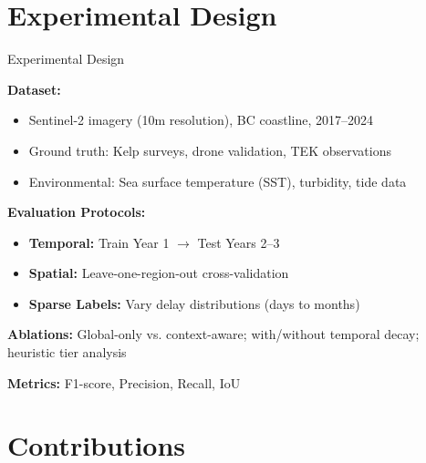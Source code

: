 \documentclass[10pt,xcolor={table,dvipsnames}]{beamer}
\begin{document}
\section{Experimental Design}

\begin{frame}{Experimental Design}

\textbf{Dataset:}
\begin{itemize}
  \item Sentinel-2 imagery (10m resolution), BC coastline, 2017--2024
  \item Ground truth: Kelp surveys, drone validation, TEK observations
  \item Environmental: Sea surface temperature (SST), turbidity, tide data
\end{itemize}

\vspace{0.3em}
\textbf{Evaluation Protocols:}
\begin{itemize}
  \item \textbf{Temporal:} Train Year 1 $\rightarrow$ Test Years 2--3
  \item \textbf{Spatial:} Leave-one-region-out cross-validation
  \item \textbf{Sparse Labels:} Vary delay distributions (days to months)
\end{itemize}

\vspace{0.3em}
\textbf{Ablations:} Global-only vs. context-aware; with/without temporal decay; heuristic tier analysis

\vspace{0.3em}
\textbf{Metrics:} F1-score, Precision, Recall, IoU

\end{frame}

\section{Contributions}
\end{document}
